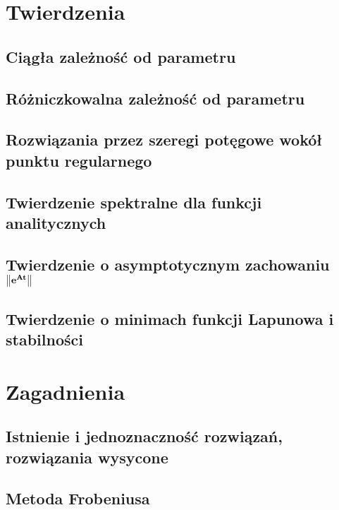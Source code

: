 



  \maketitle
  
  \tableofcontents
  
  \chapter{Twierdzenia}
    \section{Ciągła zależność od parametru}
      
    \section{Różniczkowalna zależność od parametru}
      
    \section{Rozwiązania przez szeregi potęgowe wokół punktu regularnego}
      
    \section{Twierdzenie spektralne dla funkcji analitycznych}
      
    \section{Twierdzenie o asymptotycznym zachowaniu $\mathbf{ \norm*{ e^{At} } } $}
    \section{Twierdzenie o minimach funkcji Lapunowa i stabilności}
    
  \chapter{Zagadnienia}
    \section{Istnienie i jednoznaczność rozwiązań, rozwiązania wysycone}
      
    \section{Metoda Frobeniusa}
